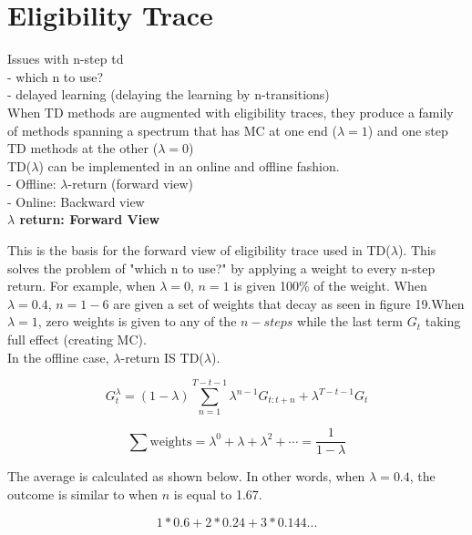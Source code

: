 \documentclass{article}
\begin{document}
\newpage
\section{Eligibility Trace}

 Issues with n-step td\\
- which n to use?\\
- delayed learning (delaying the learning by n-transitions)\\

\noindent
When TD methods are augmented with eligibility traces, they produce a family of
methods spanning a spectrum that has MC at one end ($\lambda = 1$) and one step
TD methods at the other ($\lambda = 0$)\\

\noindent
TD($\lambda$) can be implemented in an online and offline fashion.\\
- Offline: $\lambda$-return (forward view)\\
- Online: Backward view\\

\noindent
\textbf{$\lambda$ return: Forward View}

\noindent
This is the basis for the forward view of eligibility trace used in
TD($\lambda$). This solves the problem of "which n to use?" by applying a weight
to every n-step return. For example, when $\lambda = 0$, $n=1$ is given 100\% of
the weight. When $\lambda=0.4$, $n=1-6$ are given a set of weights that decay as
seen in figure 19.When $\lambda = 1$, zero weights is given to any of the
$n-steps$ while the last term $G_{t}$ taking full effect (creating MC).\\

\noindent
In the offline case, $\lambda$-return IS TD($\lambda$).

\begin{equation}
G_{t}^{\lambda}=(1-\lambda) \sum_{n=1}^{T-t-1} \lambda^{n-1} G_{t: t+n}+\lambda^{T-t-1} G_{t}
\end{equation}

\begin{equation}
\sum \text {weights}=\lambda^{0}+\lambda+\lambda^{2}+\cdots=\frac{1}{1-\lambda}
\end{equation}

\noindent
The average is calculated as shown below. In other words, when $\lambda = 0.4$,
the outcome is similar to when $n$ is equal to 1.67.

\begin{equation}
1*0.6 + 2*0.24 + 3*0.144 ... 
\end{equation}
\end{document}
